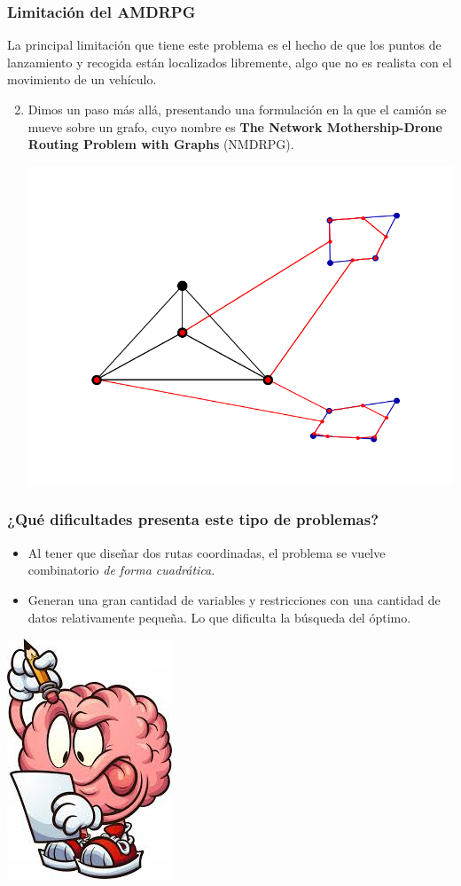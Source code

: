 \documentclass[slidestop,usepdftitle=false, xcolor=table]{beamer}
\begin{document}
	\begin{frame}
		\frametitle{Limitación del AMDRPG}
		La principal limitación que tiene este problema es el hecho de que los puntos de lanzamiento y recogida están localizados libremente, algo que no es realista con el movimiento de un vehículo.
		\begin{small}
			\begin{enumerate}
				\setcounter{enumi}{1}
				\item Dimos un paso más allá, presentando una formulación en la que el camión se mueve sobre un grafo, cuyo nombre es \textbf{The Network Mothership-Drone Routing Problem with Graphs} (NMDRPG).
				\begin{center}
					\includegraphics[width=0.5\linewidth]{NDMTZ}
				\end{center}
			\end{enumerate}
		\end{small}
	\end{frame}

	\begin{frame}
		\frametitle{¿Qué dificultades presenta este tipo de problemas?}
		\begin{itemize}
			\item Al tener que diseñar dos rutas coordinadas, el problema se vuelve combinatorio \textit{de forma cuadrática}.
			\item Generan una gran cantidad de variables y restricciones con una cantidad de datos relativamente pequeña. Lo que dificulta la búsqueda del óptimo.
		\end{itemize}
		\begin{center}
			\includegraphics[width=0.25\linewidth]{cerebro}
		\end{center}
	\end{frame}
\end{document}
